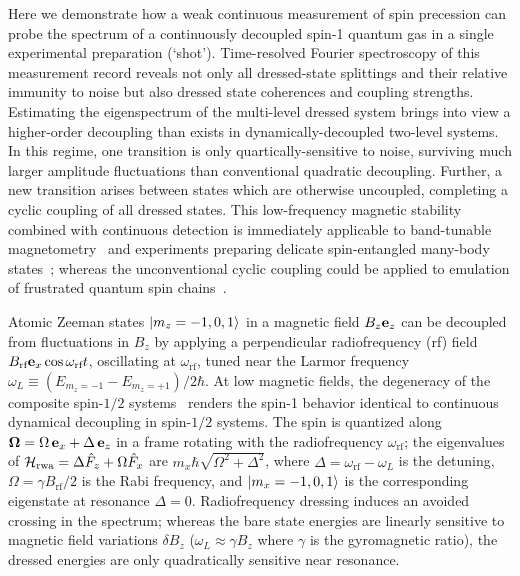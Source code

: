 \documentclass[aps,prl,reprint,superscriptaddress,floatfix]{revtex4-1}
\begin{document}
Here we demonstrate how a weak continuous measurement of spin precession can probe the spectrum of a continuously decoupled spin-1 quantum gas in a single experimental preparation (`shot').
Time-resolved Fourier spectroscopy of this measurement record reveals not only all dressed-state splittings and their relative immunity to noise but also dressed state coherences and coupling strengths.
Estimating the eigenspectrum of the multi-level dressed system brings into view a higher-order decoupling than exists in dynamically-decoupled two-level systems.
In this regime, one transition is only quartically-sensitive to noise, surviving much larger amplitude fluctuations than conventional quadratic decoupling.
Further, a new transition arises between states which are otherwise uncoupled, completing a cyclic coupling of all dressed states. 
This low-frequency magnetic stability combined with continuous detection is immediately applicable to band-tunable magnetometry~\cite{hirose_continuous_2012,loretz_radio-frequency_2013,ockeloen_quantum_2013,*horsley_frequency-tunable_2016} and experiments preparing delicate spin-entangled many-body states~\cite{stamper-kurn_spinor_2013}; whereas the unconventional cyclic coupling could be applied to emulation of frustrated quantum spin chains~\cite{mikeska_one-dimensional_2004}.

Atomic Zeeman states $\vert m_z=-1,0,1 \rangle $ in a magnetic field $B_z \mathbf{e}_z$ can be decoupled from fluctuations in $B_z$ by applying a perpendicular radiofrequency (rf) field $B_{\text{rf}} \mathbf{e}_x \cos \omega_\text{rf} t$, oscillating at $\omega_\text{rf}$, tuned near the Larmor frequency $\omega_L \equiv (E_{m_z=-1}-E_{m_z=+1})/2\hbar$.
At low magnetic fields, the degeneracy of the composite spin-$1/2$ systems~\cite{majorana_atomi_1932} renders the spin-1 behavior identical to continuous dynamical decoupling in spin-$1/2$ systems.
The spin is quantized along $\mathbf{\Omega} = \Omega \, \mathbf{e}_x + \Delta \, \mathbf{e}_z$ in a frame rotating with the radiofrequency $\omega_{\text{rf}}$; the eigenvalues of $\mathcal{H}_{\text{rwa}} = \Delta \hat{F}_z + \Omega \hat{F}_x$ are $m_x \hbar \sqrt{\Omega^2 + \Delta^2}$, where $\Delta = \omega_{\text{rf}}-\omega_L$ is the detuning, $\Omega = \gamma B_{\text{rf}} / 2$ is the Rabi frequency, and $\vert m_x=-1,0,1 \rangle $ is the corresponding eigenstate at resonance $\Delta=0$.
Radiofrequency dressing induces an avoided crossing in the spectrum; whereas the bare state energies are linearly sensitive to magnetic field variations $\delta B_z$ ($\omega_L \approx \gamma B_z$ where $\gamma$ is the gyromagnetic ratio), the dressed energies are only quadratically sensitive near resonance.
\end{document}
